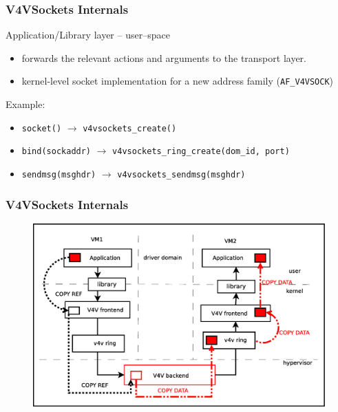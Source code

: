\documentclass[red,slidestop,notes,compress,mathserif]{beamer}
\begin{document}
\begin{frame}
\frametitle{V4VSockets Internals}
\begin{block}{Application/Library layer -- user--space}
\begin{itemize}
\item forwards the relevant actions and arguments to the transport layer.
\item kernel-level socket implementation for a new address family (\texttt{AF\_V4VSOCK})
\end{itemize}
\end{block}
\begin{block}{Example:}
\begin{itemize}
\item \texttt{socket()} $\rightarrow$ \texttt{v4vsockets\_create()}
\item \texttt{bind(sockaddr)} $\rightarrow$ \texttt{v4vsockets\_ring\_create(dom\_id, port)}
\item \texttt{sendmsg(msghdr)} $\rightarrow$ \texttt{v4vsockets\_sendmsg(msghdr)}
\end{itemize}
\end{block}
\end{frame}

\begin{frame}
\frametitle{V4VSockets Internals}
\begin{figure}
\includegraphics[scale=0.30]{figures/v4vsockets.eps}
\end{figure}
\end{frame}
\end{document}

